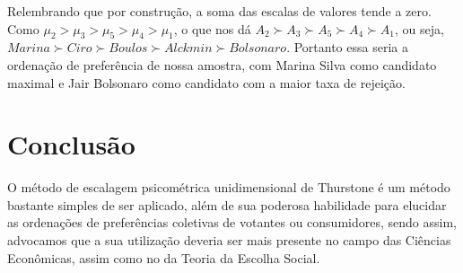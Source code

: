 \documentclass[
	article,			%
	12pt,				%
	oneside,			%
	a4paper,			%
	english,			%
	brazil,				%
	]{abntex2}
\begin{document}
Relembrando que por construção, a soma das escalas de valores tende a zero. 
Como $\mu_\textit{2} > \mu_\textit{3} > \mu_\textit{5} > \mu_\textit{4} > \mu_\textit{1}$, o que nos dá $A_\textit{2} \succ A_\textit{3} \succ A_\textit{5} \succ A_\textit{4} \succ A_\textit{1}$, ou seja, $Marina \succ Ciro\succ Boulos \succ Alckmin \succ Bolsonaro$. Portanto essa seria a ordenação de preferência de nossa amostra, com Marina Silva como candidato maximal e Jair Bolsonaro como candidato com a maior taxa de rejeição.











\section{Conclusão}
O método de escalagem psicométrica unidimensional de Thurstone é um método bastante simples de ser aplicado, além de sua poderosa habilidade para elucidar as ordenações de preferências coletivas de votantes ou consumidores, sendo assim, advocamos que a sua utilização deveria ser mais presente no campo das Ciências Econômicas, assim como no da Teoria da Escolha Social. 
% 





\postextual



%
%
\end{document}
